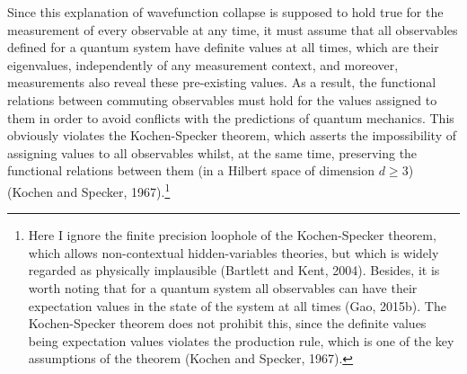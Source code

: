 Since this explanation of wavefunction collapse is supposed to hold true for the measurement of every observable at any time, it must assume that all observables defined for a quantum system have definite values at all times, which are their eigenvalues, independently of any measurement context, and moreover, measurements also reveal these pre-existing values. As a result, the functional relations between commuting observables must hold for the values assigned to them in order to avoid conflicts with the predictions of quantum mechanics. 
This obviously violates the Kochen-Specker theorem, which asserts the impossibility of assigning values to all observables whilst, at the same time, preserving the functional relations between them  (in a Hilbert space of dimension $d \geqslant 3$) (Kochen and Specker, 1967).\footnote{Here I ignore the finite precision loophole of the Kochen-Specker theorem, which allows non-contextual hidden-variables theories, but which is widely regarded as physically implausible (Bartlett and Kent, 2004). Besides, it is worth noting that for a quantum system all observables can have their expectation values in the state of the system at all times (Gao, 2015b). The Kochen-Specker theorem does not prohibit this, since the definite values being expectation values violates the production rule, which is one of the key assumptions of the theorem (Kochen and Specker, 1967).} 

